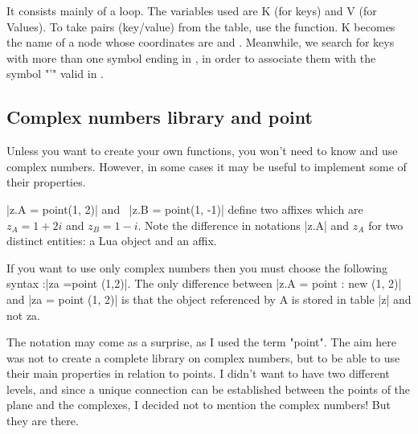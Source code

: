 It consists mainly of a loop. The variables used are K (for keys) and V (for Values). To take pairs (key/value) from the  table, use the  function. K becomes the name of a node whose coordinates are  and . Meanwhile, we search for keys with more than one symbol ending in , in order to associate them with the symbol "'" valid in \TIKZ{}.

\subsection{Complex numbers library and point}
\label{sub:complex_numbers}

Unless you want to create your own functions, you won't need to know and use complex numbers. However, in some cases it may be useful to implement some of their properties.


|z.A = point(1, 2)| and \ |z.B = point(1, -1)| define two affixes which are $z_A = 1+2i$ and $z_B = 1-i$. Note the difference in notations |z.A| and $z_A$ for two distinct entities: a Lua object and an affix.

\vspace{1em}
If you want to use only complex numbers then you must choose the following syntax :|za =point (1,2)|.
The only difference between |z.A = point : new (1, 2)| and |za = point (1, 2)| is that the object referenced by A is stored in table |z| and not za.

 The notation may come as a surprise, as I used the term "point". The aim here was not to create a complete library on complex numbers, but to be able to use their main properties in relation to points. I didn't want to have two different levels, and since a unique connection can be established between the points of the plane and the complexes, I decided not to mention the complex numbers! But they are there.


